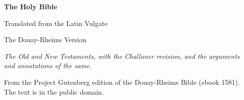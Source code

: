 \documentclass[11pt,letterpaper]{article}
\begin{document}
\color{ink}

\begin{titlepage}
\centering
\vspace*{5em}
{\LARGE\bfseries\color{heading} The Holy Bible\par}
\vspace{1.2em}
{\large Translated from the Latin Vulgate\par}
\vspace{0.4em}
{\large\color{subhead} The Douay-Rheims Version\par}
\vspace{2.5em}
{\itshape\color{subhead} The Old and New Testaments, with the Challoner
revision, and the arguments and annotations of the same.\par}
\vfill
{\small From the Project Gutenberg edition of the Douay-Rheims Bible
(ebook 1581). The text is in the public domain.\par}
\vspace{2em}
\end{titlepage}

\tableofcontents


\end{document}
